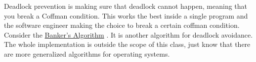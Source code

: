 Deadlock prevention is making sure that deadlock cannot happen, meaning that you break a Coffman condition. This works the best inside a single program and the software engineer making the choice to break a certain coffman condition. Consider the \href{https://en.wikipedia.org/wiki/Banker's_algorithm}{Banker's Algorithm} \cite{Dijkstra:1965:CSP:1102034}. It is another algorithm for deadlock avoidance. The whole implementation is outside the scope of this class, just know that there are more generalized algorithms for operating systems.

